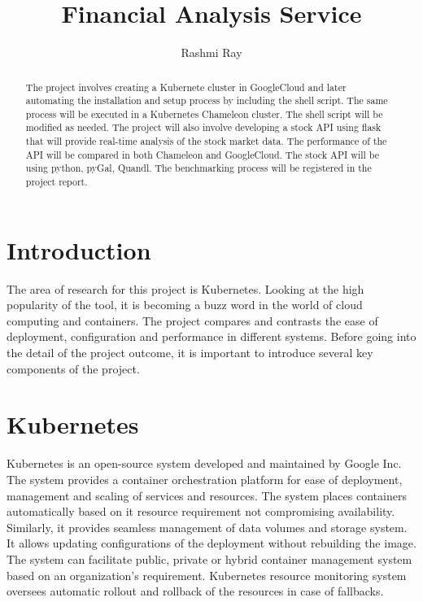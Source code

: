 
\title{Financial Analysis Service}

\author{Rashmi Ray}

\renewcommand{\shortauthors}{Uma Kugan}

\begin{abstract}
The project involves creating a Kubernete cluster in GoogleCloud and later 
automating the installation and setup process by including the shell script.
The same process will be executed in a Kubernetes Chameleon cluster. The shell
script will be modified as needed. The project will also involve developing a 
stock API using flask that will provide real-time analysis of the stock market 
data. The performance of the API will be compared in both Chameleon and 
GoogleCloud. The stock API will be using python, pyGal, Quandl. The 
benchmarking process will be registered in the project report.

\end{abstract}



\maketitle

\section{Introduction}

The area of research for this project is Kubernetes. Looking at the high
 popularity of the tool, it is becoming a buzz word in the world of cloud 
 computing and containers. The project compares and contrasts the ease of
  deployment, configuration and performance in different systems. Before going 
  into the detail of the project outcome, it is important to introduce several
   key components of the project.

\section{Kubernetes}
Kubernetes is an open-source system developed and maintained by Google Inc.
 The system provides a container orchestration platform for ease of deployment,
 management and scaling of services and resources. The system places containers
 automatically based on it resource requirement not compromising availability.
  Similarly, it provides seamless management of data volumes and storage 
  system.
  It allows updating configurations of the deployment without rebuilding the
   image. The system can facilitate public, private or hybrid container 
   management system based on an organization's requirement.  Kubernetes 
   resource monitoring system oversees automatic rollout and rollback of the 
   resources in case of fallbacks.



